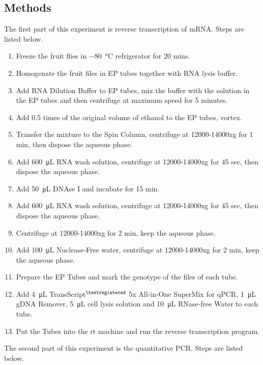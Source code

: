     \subsection{Methods}
		
		The first part of this experiment is reverse transcription of mRNA. Steps are listed below.
		
		\begin{enumerate}
			\item Freeze the fruit flies in \SI{-80}{\celsius} refrigerator for 20 mins.
			\item Homogenate the fruit files in EP tubes together with RNA lysis buffer.
			\item Add RNA Dilution Buffer to EP tubes, mix the buffer with the solution in the EP tubes and then centrifuge at maximum speed for 5 minutes.
			\item Add 0.5 times of the original volume of ethanol to the EP tubes, vortex.
			\item Transfer the mixture to the Spin Column, centrifuge at 12000-14000xg for 1 min, then dispose the aqueous phase.
			\item Add \SI{600}{\uL} RNA wash solution, centrifuge at 12000-14000xg for 45 sec, then dispose the aqueous phase.
			\item Add \SI{50}{\uL} DNAse I and incubate for 15 min.
			\item Add \SI{600}{\uL} RNA wash solution, centrifuge at 12000-14000xg for 45 sec, then dispose the aqueous phase.
			\item Centrifuge at 12000-14000xg for 2 min, keep the aqueous phase.
			\item Add \SI{100}{\uL} Nuclease-Free water, centrifuge at 12000-14000xg for 2 min, keep the aqueous phase.
			\item Prepare the EP Tubes and mark the genotype of the files of each tube.
			\item Add \SI{4}{\uL} TransScript$^{\tiny{\textregistered}}$ 5x All-in-One SuperMix for qPCR, \SI{1}{\uL} gDNA Remover, \SI{5}{\uL} cell lysis solution and \SI{10}{\uL} RNase-free Water to each tube.
			\item Put the Tubes into the rt machine and run the reverse transcription program.
		\end{enumerate}
	
		The second part of this experiment is the quantitative PCR. Steps are listed below.
		
